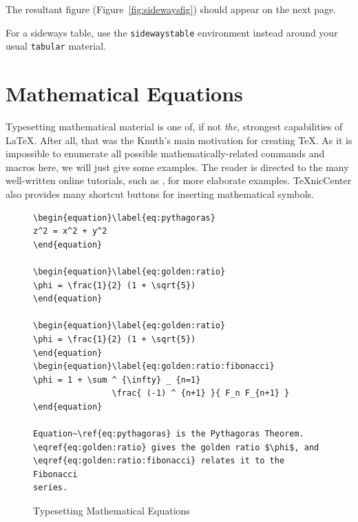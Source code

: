 The resultant figure (Figure~\ref{fig:sidewaysfig}) should appear on the next page.

For a sideways table, use the \verb|sidewaystable| environment instead around your usual \verb|tabular| material.



\section{Mathematical Equations}


Typesetting mathematical material is one of, if not \emph{the}, strongest capabilities of \LaTeX.  After all, that was the Knuth's main motivation for creating \TeX{}.  As it is impossible to enumerate all possible mathematically-related commands and macros here, we will just give some examples.  The reader is directed to the many well-written online tutorials, such as \citep{roberts}, for more elaborate examples.  TeXnicCenter also provides many shortcut buttons for inserting mathematical symbols.

\begin{figure}[htb!]
\begin{lstlisting}
\begin{equation}\label{eq:pythagoras}
z^2 = x^2 + y^2
\end{equation}

\begin{equation}\label{eq:golden:ratio}
\phi = \frac{1}{2} (1 + \sqrt{5})
\end{equation}

\begin{equation}\label{eq:golden:ratio}
\phi = \frac{1}{2} (1 + \sqrt{5})
\end{equation}
\begin{equation}\label{eq:golden:ratio:fibonacci}
\phi = 1 + \sum ^ {\infty} _ {n=1}
                \frac{ (-1) ^ {n+1} }{ F_n F_{n+1} }
\end{equation}

Equation~\ref{eq:pythagoras} is the Pythagoras Theorem.
\eqref{eq:golden:ratio} gives the golden ratio $\phi$, and
\eqref{eq:golden:ratio:fibonacci} relates it to the Fibonacci
series.
\end{lstlisting}
\caption{Typesetting Mathematical Equations}\label{fig:lst:equation}
\end{figure}

